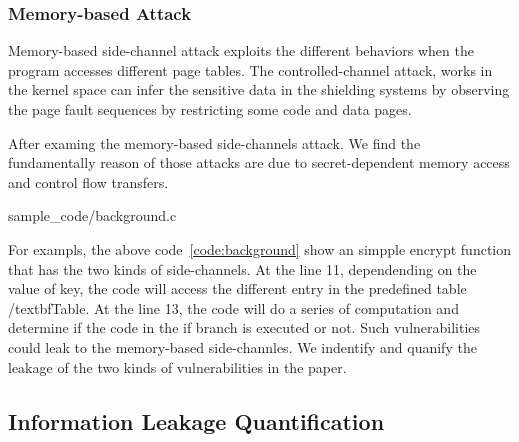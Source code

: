 \subsubsection{Memory-based Attack}
Memory-based side-channel attack\cite{} exploits the different behaviors when the
program accesses different page tables. The controlled-channel attack\cite{7163052},
works in the kernel space can infer the sensitive data in the shielding systems by
observing the page fault sequences by restricting some code and
data pages. 

After examing the memory-based side-channels attack. We find the fundamentally
reason of those attacks are due to secret-dependent memory access and control
flow transfers.

                 {sample_code/background.c}

For exampls, the above code~\ref{code:background} show an simpple encrypt function that
has the two kinds of side-channels. At the line 11, dependending on the value of key,
the code will access the different entry in the predefined table /textbf{Table}. At the
line 13, the code will do a series of computation and determine if the code in the if
branch is executed or not. Such vulnerabilities could leak to the memory-based 
side-channles. We indentify and quanify the leakage of the two kinds of vulnerabilities 
in the paper.

\subsection{Information Leakage Quantification}


